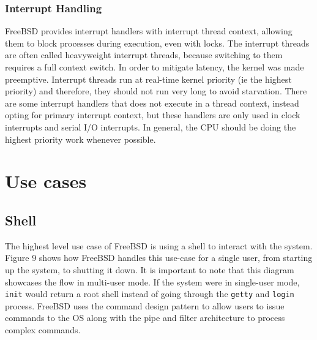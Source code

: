 \documentclass[12pt, dvipsnames, a4paper]{article}
\newcommand{\code}[1]{\texttt{#1}}
\begin{document}
\subsubsection{Interrupt Handling}
FreeBSD provides interrupt handlers with interrupt thread context, allowing them to block processes during execution, even with locks. The interrupt threads are often called heavyweight interrupt threads, because switching to them requires a full context switch. In order to mitigate latency, the kernel was made preemptive. Interrupt threads run at real-time kernel priority (ie the highest priority) and therefore, they should not run very long to avoid starvation. There are some interrupt handlers that does not execute in a thread context, instead opting for primary interrupt context, but these handlers are only used in clock interrupts and serial I/O interrupts. In general, the CPU should be doing the highest priority work whenever possible.
\clearpage

\section{Use cases}
\subsection{Shell}
The highest level use case of FreeBSD is using a shell to interact with the system.
Figure 9 shows how FreeBSD handles this use-case for a single user,
from starting up the system, to shutting it down. It is important to note that
this diagram showcases the flow in multi-user mode. If the system were in
single-user mode, \code{init} would return a root shell instead of going through the
\code{getty} and \code{login} process\cite{bootprocess}\cite{init}. FreeBSD uses the command design pattern to allow users to issue commands to the OS along with the pipe and filter architecture to process complex commands.
\end{document}
